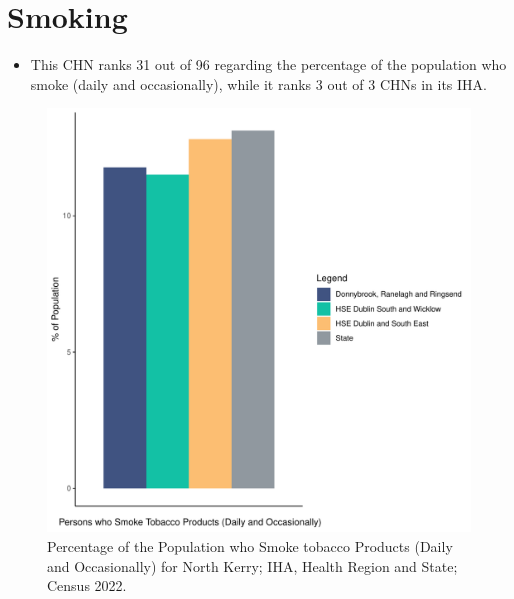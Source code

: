\documentclass{article}
\begin{document}
\pagebreak

\section{Smoking}\label{sect:Smoking}
\begin{itemize}
\item This CHN ranks  31 out of 96 regarding the percentage of the population who smoke (daily and occasionally), while it ranks   3 out of 3 CHNs in its IHA.
\end{itemize}
\begin{figure}[H]
	\centering
	\includegraphics[width = 120mm]{../figures/SmokingED.pdf}
	\caption{Percentage of the Population who Smoke tobacco Products (Daily and Occasionally) for North Kerry; IHA, Health Region and State; Census 2022.}
	\label{fig:2ae19629-1a6a-13a3-e055-000000000001}
	\end{figure}
	
\end{document}
